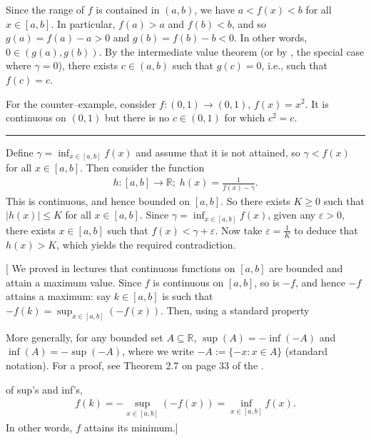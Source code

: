 \documentclass[letterpaper,10pt,english]{jupyterBook}
\begin{document}
\sphinxAtStartPar
Since the range of \(f\) is contained in \((a, b)\), we have \(a<f(x)<b\) for all \(x\in[a,b]\). In particular, \(f(a) > a\) and \(f(b) < b\), and so \(g(a) = f(a) - a > 0\) and \(g(b) = f(b) - b < 0\). In other words, \(0\in(g(a),g(b))\). By the intermediate value theorem (or by , the special case where \(\gamma=0\)), there exists \(c \in (a, b)\) such that \(g(c) = 0\), i.e., such that \(f(c) = c\).

\sphinxAtStartPar
For the counter–example, consider \(f:(0,1)\to(0,1)\), \(f(x) = x^2\). It is continuous on \((0, 1)\) but there is no \(c \in (0, 1)\) for which \(c^2 = c\).


\bigskip\hrule\bigskip


\sphinxAtStartPar
{\hyperref[\detokenize{Problems:id26}]{}} Define \(\gamma = \inf_{x \in [a, b]}f(x)\) and assume that it is not attained, so \(\gamma < f(x)\) for all \(x \in [a,b]\). Then consider the function
\begin{equation*}
\begin{split}
h:[a,b]\to \mathbb{R}; \; h(x) = \displaystyle\frac{1}{f(x) - \gamma}.
\end{split}
\end{equation*}
\sphinxAtStartPar
This is continuous, and hence bounded on \([a, b]\). So there exists \(K \geq 0\) such that \(|h(x)| \leq K\) for all \(x \in [a, b]\). Since \(\gamma=\inf_{x\in[a,b]}f(x)\), given any \(\varepsilon > 0\), there exists \(x \in [a, b]\) such that \(f(x) < \gamma + \varepsilon\). Now take \(\varepsilon = \frac{1}{K}\) to deduce that \(h(x) > K\), which yields the required contradiction.

\sphinxAtStartPar
{[} We proved in lectures that continuous functions on \([a,b]\) are bounded and attain a maximum value. Since \(f\) is continuous on \([a,b]\), so is \(-f\), and hence \(-f\) attains a maximum: say \(k\in[a,b]\) is such that \(-f(k)=\sup_{x\in[a,b]}(-f(x))\). Then, using a standard property%
\begin{footnote}[2]\sphinxAtStartFootnote
More generally, for any bounded set \(A\subseteq\mathbb{R}\), \(\sup(A)=-\inf(-A)\) and \(\inf(A)=-\sup(-A)\), where we write \(-A:=\{-x:x\in A\}\) (standard notation). For a proof, see Theorem 2.7 on page 33 of the .
%
\end{footnote} of sup’s and inf’s,
\begin{equation*}
\begin{split}
f(k)=-\sup_{x\in[a,b]}(-f(x)) = \inf_{x\in[a,b]}f(x).
\end{split}
\end{equation*}
\sphinxAtStartPar
In other words, \(f\) attains its minimum.{]}
\end{document}
